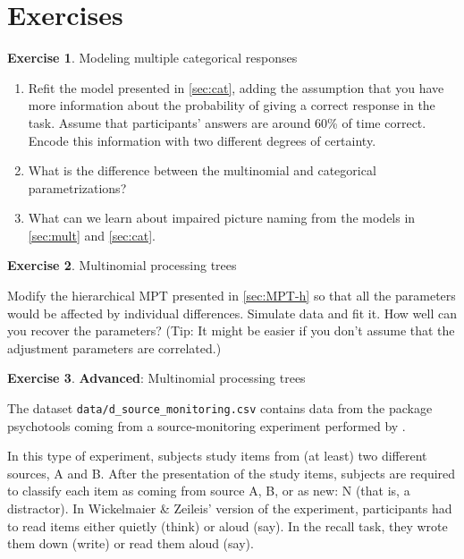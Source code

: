 \documentclass[12pt,]{krantz}
\providecommand{\tightlist}{%
  \setlength{\itemsep}{0pt}\setlength{\parskip}{0pt}}
\theoremstyle{definition}
\theoremstyle{definition}
\theoremstyle{definition}
\newtheorem{exercise}{Exercise}[chapter]
\theoremstyle{remark}
\begin{document}
\section{Exercises}\label{exercises-9}

\begin{exercise} \protect\hypertarget{exr:mult}{}{\label{exr:mult}
}Modeling multiple categorical responses \end{exercise}

\begin{enumerate}
\def\labelenumi{\arabic{enumi}.}
\tightlist
\item
  Refit the model presented in \ref{sec:cat}, adding the assumption that
  you have more information about the probability of giving a correct
  response in the task. Assume that participants' answers are around
  60\% of time correct. Encode this information with two different
  degrees of certainty.
\item
  What is the difference between the multinomial and categorical
  parametrizations?
\item
  What can we learn about impaired picture naming from the models in
  \ref{sec:mult} and \ref{sec:cat}.
\end{enumerate}

\begin{exercise} \protect\hypertarget{exr:mpt}{}{\label{exr:mpt}
}Multinomial processing trees \end{exercise}

Modify the hierarchical MPT presented in \ref{sec:MPT-h} so that all the
parameters would be affected by individual differences. Simulate data
and fit it. How well can you recover the parameters? (Tip: It might be
easier if you don't assume that the adjustment parameters are
correlated.)

\begin{exercise}
\protect\hypertarget{exr:mpt-adv}{}{\label{exr:mpt-adv} }\textbf{Advanced}:
Multinomial processing trees \end{exercise}

The dataset \texttt{data/d\_source\_monitoring.csv} contains data from
the package psychotools coming from a source-monitoring experiment
\citep{batchelder1990multinomial} performed by
\citet{wickelmaier2018using}.

In this type of experiment, subjects study items from (at least) two
different sources, A and B. After the presentation of the study items,
subjects are required to classify each item as coming from source A, B,
or as new: N (that is, a distractor). In Wickelmaier \& Zeileis' version
of the experiment, participants had to read items either quietly (think)
or aloud (say). In the recall task, they wrote them down (write) or read
them aloud (say).
\end{document}
